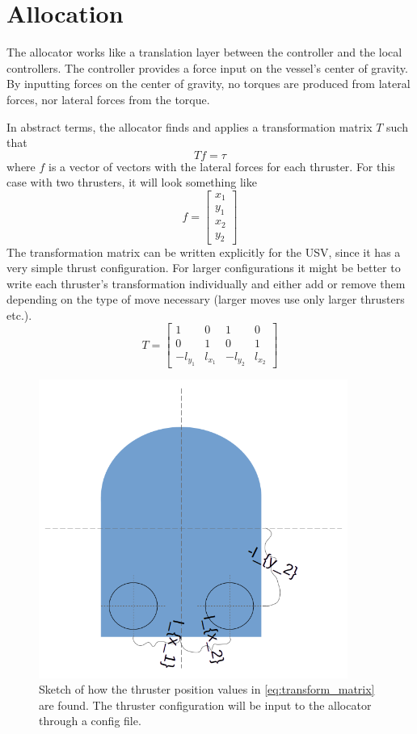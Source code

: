 \documentclass[class=article, crop=false, draft=true]{standalone}
\begin{document}
\section{Allocation}
The allocator works like a translation layer between the controller and the local controllers. The controller provides a force input on the vessel's center of gravity. By inputting forces on the center of gravity, no torques are produced from lateral forces, nor lateral forces from the torque.

In abstract terms, the allocator finds and applies a transformation matrix \(T\) such that \[Tf = \tau\] where \(f\) is a vector of vectors with the lateral forces for each thruster. For this case with two thrusters, it will look something like \[f = \begin{bmatrix}x_1 \\ y_1 \\ x_2 \\ y_2 \end{bmatrix}\]
The transformation matrix can be written explicitly for the USV, since it has a very simple thrust configuration. For larger configurations it might be better to write each thruster's transformation individually and either add or remove them depending on the type of move necessary (larger moves use only larger thrusters etc.).
\begin{equation}\label{eq:transform_matrix}
T = \begin{bmatrix}1 & 0 & 1 & 0 \\ 0 & 1 & 0 & 1 \\ -l_{y_1} & l_{x_1} & -l_{y_2} & l_{x_2}\end{bmatrix}
\end{equation}

\begin{figure}
    \centering
    \includegraphics[width=0.9\textwidth]{thruster_position_sketch}
    \caption{Sketch of how the thruster position values in \cref{eq:transform_matrix} are found. The thruster configuration will be input to the allocator through a config file.}
    \label{fig:thruster_position_sketch}
\end{figure}
\end{document}
